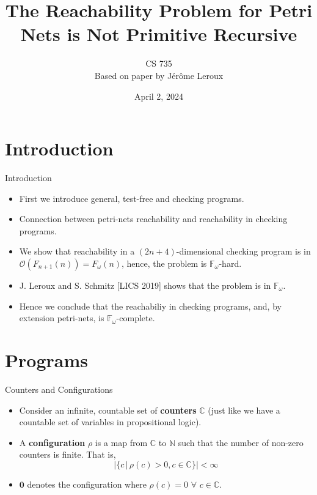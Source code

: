 \documentclass{beamer}
\title[Reachability in Petri Nets]{The Reachability Problem for Petri Nets is Not Primitive Recursive}
\author[CS 735]{CS 735 \\ Based on paper by J\'{e}r\^{o}me Leroux}
\date{April 2, 2024}
\renewcommand{\b}[1]{\boldsymbol{#1}}
\newcommand{\zero}[0]{\b{0}}
\begin{document}
\frame{\titlepage}


\section{Introduction}

\begin{frame}{Introduction}
    \begin{itemize}
         \item First we introduce general, test-free and checking programs.
        \item Connection between petri-nets reachability and reachability in checking programs. 
        \pause
        \item We show that reachability in a $(2n+4)$-dimensional checking program is in $\mathcal{O}(F_{n+1}(n)) = F_\omega(n)$, hence, the problem is $\mathbb{F}_\omega$-hard. 
        \item J. Leroux and S. Schmitz [LICS 2019] shows that the problem is in $\mathbb{F}_\omega$.
        \item Hence we conclude that the reachabiliy in checking programs, and, by extension petri-nets, is $\mathbb{F}_\omega$-complete.  
    \end{itemize}
   
\end{frame}

\section{Programs}

\begin{frame}{Counters and Configurations}

\begin{itemize}
    \item Consider an infinite, countable set of \textbf{counters} $\mathbb{C}$ (just like we have a countable set of variables in propositional logic).

    \item A \textbf{configuration} $\rho$ is a map from $\mathbb{C}$ to $\mathbb{N}$ such that the number of non-zero counters is finite. That is,
    $$|\{c \, | \, \rho(c) > 0,  c\in \mathbb{C}\}| < \infty$$
    \item $\zero{}$ denotes the configuration where $\rho(c)=0$ $\forall$ $c\in \mathbb{C}$.
\end{itemize}
    
\end{frame}
\end{document}
